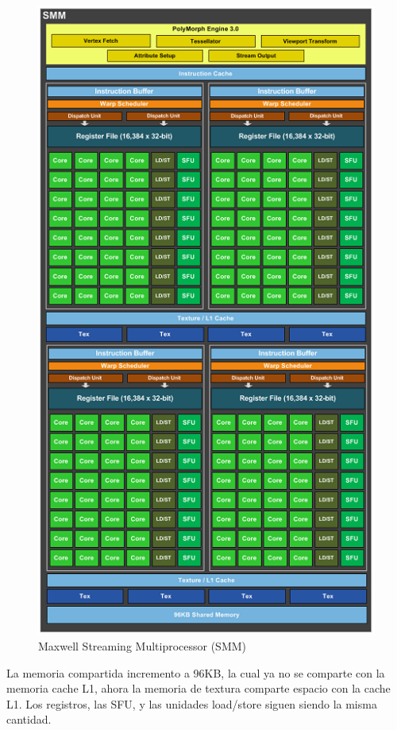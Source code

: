 \begin{figure}[ph]
			\centering
				\includegraphics[scale=0.6]{img/MaxwellSM.png}
			\caption{Maxwell Streaming Multiprocessor (SMM) \cite{Maxwell}}
\end{figure}

La memoria compartida incremento a 96KB, la cual ya no se comparte con la memoria cache L1, ahora la memoria de textura comparte espacio con la cache L1. Los registros, las SFU, y las unidades load/store siguen siendo la misma cantidad.
\\\\\\\\\\\\\\\\\\\\\\\\\


